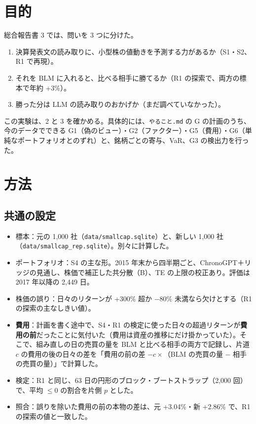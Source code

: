 \documentclass[xelatex,ja=standard,jafont=haranoaji,a4paper,10pt,openany]{bxjsreport}
\newcommand{\code}[1]{\texttt{#1}}
\begin{document}
\setcounter{tocdepth}{1}
{\small\tableofcontents}

\chapter{目的}\label{ch:purpose}

総合報告書 3 では、問いを 3 つに分けた。

\begin{enumerate}
\item 決算発表文の読み取りに、小型株の値動きを予測する力があるか（S1・S2、R1 で再現）。
\item それを BLM に入れると、比べる相手に勝てるか（R1 の探索で、両方の標本で年約 +3\%）。
\item 勝った分は LLM の読み取りのおかげか（まだ調べていなかった）。
\end{enumerate}

この実験は、2 と 3 を確かめる。具体的には、\code{やること.md} の G の計画のうち、今のデータでできる G1（偽のビュー）・G2（ファクター）・G5（費用）・G6（単純なポートフォリオとのずれ）と、銘柄ごとの寄与、VaR、G3 の検出力を行った。

\chapter{方法}\label{ch:method}

\section{共通の設定}

\begin{itemize}
\item 標本：元の 1,000 社（\code{data/smallcap.sqlite}）と、新しい 1,000 社（\code{data/smallcap\_rep.sqlite}）。別々に計算した。
\item ポートフォリオ：S4 の主な形。2015 年末から四半期ごと、ChronoGPT＋リッジの見通し、株価で補正した共分散（B）、TE の上限の校正あり。評価は 2017 年以降の 2,449 日。
\item 株価の誤り：日々のリターンが +300\% 超か $-80\%$ 未満なら欠けとする（R1 の探索の主なしきい値）。
\item \textbf{費用}：計画を書く途中で、S4・R1 の検定に使った日々の超過リターンが\textbf{費用の前}だったことに気付いた（費用は資産の推移にだけ掛かっていた）。そこで、組み直しの日の売買の量を BLM と比べる相手の両方で記録し、片道 $c$ の費用の後の日々の差を「費用の前の差 $- c \times$（BLM の売買の量 $-$ 相手の売買の量）」で計算した。
\item 検定：R1 と同じ、63 日の円形のブロック・ブートストラップ（2,000 回）で、平均 $\le 0$ の割合を片側 $p$ とした。
\item 照合：誤りを除いた費用の前の本物の差は、元 +3.04\%・新 +2.86\% で、R1 の探索の値と一致した。
\end{itemize}
\end{document}
